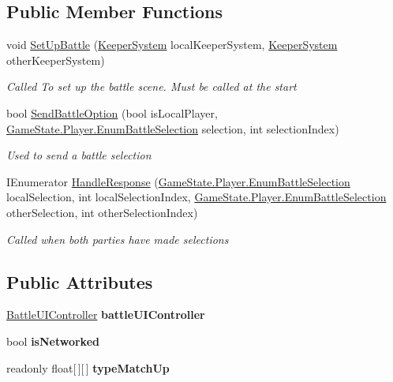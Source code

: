 \subsection*{Public Member Functions}
\begin{DoxyCompactItemize}
\item 
void \hyperlink{class_battle_handler_ad07ba8dd758a56e3a1532e53f90e1932}{Set\-Up\-Battle} (\hyperlink{class_keeper_system}{Keeper\-System} local\-Keeper\-System, \hyperlink{class_keeper_system}{Keeper\-System} other\-Keeper\-System)
\begin{DoxyCompactList}\small\item\em Called To set up the battle scene. Must be called at the start \end{DoxyCompactList}\item 
bool \hyperlink{class_battle_handler_a259e910a8ef50cbe1f610b8abdfeb3dd}{Send\-Battle\-Option} (bool is\-Local\-Player, \hyperlink{struct_game_state_1_1_player_a9f54c5eca1e60acbaa2074e981f51615}{Game\-State.\-Player.\-Enum\-Battle\-Selection} selection, int selection\-Index)
\begin{DoxyCompactList}\small\item\em Used to send a battle selection \end{DoxyCompactList}\item 
I\-Enumerator \hyperlink{class_battle_handler_a9899956562c6a887611411ea4682957a}{Handle\-Response} (\hyperlink{struct_game_state_1_1_player_a9f54c5eca1e60acbaa2074e981f51615}{Game\-State.\-Player.\-Enum\-Battle\-Selection} local\-Selection, int local\-Selection\-Index, \hyperlink{struct_game_state_1_1_player_a9f54c5eca1e60acbaa2074e981f51615}{Game\-State.\-Player.\-Enum\-Battle\-Selection} other\-Selection, int other\-Selection\-Index)
\begin{DoxyCompactList}\small\item\em Called when both parties have made selections \end{DoxyCompactList}\end{DoxyCompactItemize}
\subsection*{Public Attributes}
\begin{DoxyCompactItemize}
\item 
\hypertarget{class_battle_handler_ad57da165c3aa4c3906b10dc80cca73e2}{\hyperlink{class_battle_u_i_controller}{Battle\-U\-I\-Controller} {\bfseries battle\-U\-I\-Controller}}\label{class_battle_handler_ad57da165c3aa4c3906b10dc80cca73e2}

\item 
\hypertarget{class_battle_handler_a91faa80b5273370273762c40a364305d}{bool {\bfseries is\-Networked}}\label{class_battle_handler_a91faa80b5273370273762c40a364305d}

\item 
readonly float\mbox{[}$\,$\mbox{]}\mbox{[}$\,$\mbox{]} {\bfseries type\-Match\-Up}
\end{DoxyCompactItemize}
